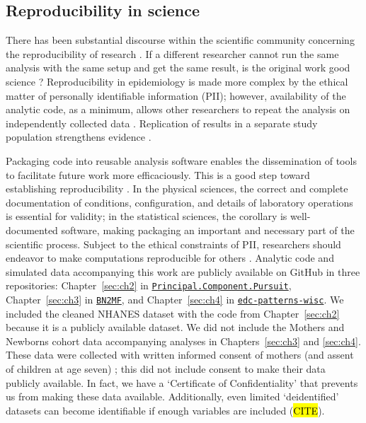 
\subsection{Reproducibility in science}\label{sec:repro}
There has been substantial discourse within the scientific community concerning the reproducibility of research \citep{baker20161}. If a different researcher cannot run the same analysis with the same setup and get the same result, is the original work good science \citep{goodman2016does}? Reproducibility in epidemiology is made more complex by the ethical matter of personally identifiable information (PII); however, availability of the analytic code, as a minimum, allows other researchers to repeat the analysis on independently collected data \citep{peng2011reproducible}. Replication of results in a separate study population strengthens evidence \citep{peng2006reproducible}.

Packaging code into reusable analysis software enables the dissemination of tools to facilitate future work more efficaciously. This is a good step toward establishing reproducibility \citep{collberg2015repeatability}. In the physical sciences, the correct and complete documentation of conditions, configuration, and details of laboratory operations is essential for validity; in the statistical sciences, the corollary is well-documented software, making packaging an important and necessary part of the scientific process. Subject to the ethical constraints of PII, researchers should endeavor to make computations reproducible for others \citep{barnes2010publish}. Analytic code and simulated data accompanying this work are publicly available on GitHub in three repositories: Chapter~\ref{sec:ch2} in \texttt{\href{https://github.com/lizzyagibson/Principal.Component.Pursuit}{Principal.Component.Pursuit}}, Chapter~\ref{sec:ch3} in \texttt{\href{https://github.com/lizzyagibson/BN2MF}{BN2MF}}, and Chapter~\ref{sec:ch4} in \texttt{\href{https://github.com/lizzyagibson/edc-patterns-wisc}{edc-patterns-wisc}}. We included the cleaned NHANES dataset with the code from Chapter~\ref{sec:ch2} because it is a publicly available dataset. We did not include the Mothers and Newborns cohort data accompanying analyses in Chapters~\ref{sec:ch3} and \ref{sec:ch4}. These data were collected with written informed consent of mothers (and assent of children at age seven) \citep{perera03}; this did not include consent to make their data publicly available. In fact, we have a `Certificate of Confidentiality' that prevents us from making these data available. Additionally, even limited `deidentified' datasets can become identifiable if enough variables are included (\hl{CITE}).

